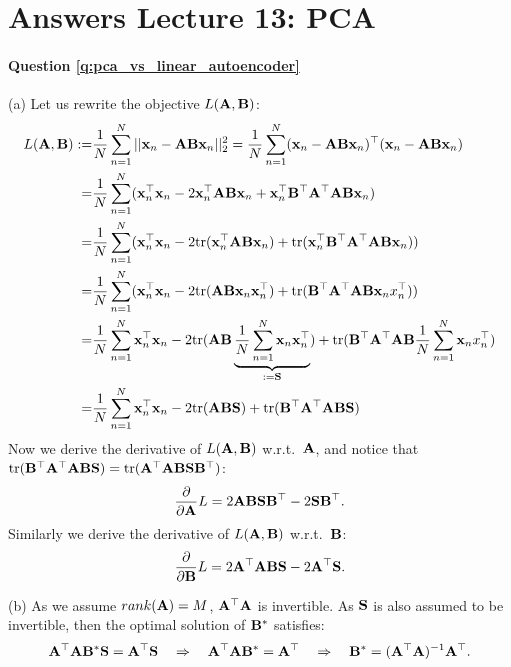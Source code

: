 \section{Answers Lecture 13: PCA}

\paragraph{Question \ref{q:pca_vs_linear_autoencoder}}
(a) Let us rewrite the objective $L(\mathbf A, \mathbf B)$:
\begin{equation*}
\begin{aligned}
L(\mathbf A, \mathbf B) :=& \frac{1}{N} \sum_{n=1}^N || \mathbf{x}_n - \mathbf A \mathbf B \mathbf{x}_n ||_2^2 = \frac{1}{N} \sum_{n=1}^N (\mathbf{x}_n - \mathbf A \mathbf B \mathbf{x}_n)^\top (\mathbf{x}_n - \mathbf A \mathbf B \mathbf{x}_n) \\
=& \frac{1}{N} \sum_{n=1}^N (\mathbf{x}_n^\top \mathbf{x}_n - 2 \mathbf{x}_n^\top \mathbf A \mathbf B \mathbf{x}_n + \mathbf{x}_n^\top \mathbf B^\top \mathbf A^\top \mathbf A \mathbf B \mathbf{x}_n) \\
=& \frac{1}{N} \sum_{n=1}^N (\mathbf{x}_n^\top \mathbf{x}_n - 2 \text{tr}(\mathbf{x}_n^\top \mathbf A \mathbf B \mathbf{x}_n) + \text{tr}(\mathbf{x}_n^\top \mathbf B^\top \mathbf A^\top \mathbf A \mathbf B \mathbf{x}_n)) \\
=& \frac{1}{N} \sum_{n=1}^N (\mathbf{x}_n^\top \mathbf{x}_n - 2 \text{tr}(\mathbf A \mathbf B \mathbf{x}_n \mathbf{x}_n^\top ) + \text{tr}(\mathbf B^\top \mathbf A^\top \mathbf A \mathbf B \mathbf{x}_n x_n^\top )) \\
=& \frac{1}{N} \sum_{n=1}^N \mathbf{x}_n^\top \mathbf{x}_n - 2 \text{tr}(\mathbf A \mathbf B \underbrace{\frac{1}{N} \sum_{n=1}^N \mathbf{x}_n \mathbf{x}_n^\top}_{:=\mathbf{S}} ) + \text{tr}(\mathbf B^\top \mathbf A^\top \mathbf A \mathbf B \frac{1}{N} \sum_{n=1}^N \mathbf{x}_n x_n^\top ) \\
=& \frac{1}{N} \sum_{n=1}^N \mathbf{x}_n^\top \mathbf{x}_n - 2 \text{tr}(\mathbf A \mathbf B \mathbf{S} ) + \text{tr}(\mathbf B^\top \mathbf A^\top \mathbf A \mathbf B \mathbf{S} )
\end{aligned}
\end{equation*}
Now we derive the derivative of $L(\mathbf A, \mathbf B)$ w.r.t.~$\mathbf A$, and notice that $ \text{tr}(\mathbf B^\top \mathbf A^\top \mathbf A \mathbf B \mathbf{S} ) =  \text{tr}(\mathbf A^\top \mathbf A \mathbf B \mathbf{S} \mathbf B^\top )$:
\begin{equation*}
\frac{\partial}{\partial \mathbf A} L = 2 \mathbf A \mathbf B \mathbf{S} \mathbf B^\top - 2 \mathbf{S} \mathbf B^\top.
\end{equation*}
Similarly we derive the derivative of $L(\mathbf A, \mathbf B)$ w.r.t.~$\mathbf B$:
\begin{equation*}
\frac{\partial}{\partial \mathbf B} L = 2 \mathbf A^\top \mathbf A \mathbf B \mathbf{S} - 2 \mathbf A^\top \mathbf{S}.
\end{equation*}

(b) As we assume $rank(\mathbf A) = M$, $\mathbf A^\top \mathbf A$ is invertible. As $\mathbf{S}$ is also assumed to be invertible, then the optimal solution of $\mathbf B^*$ satisfies:
$$ \mathbf A^\top \mathbf A \mathbf B^* \mathbf{S} =\mathbf A^\top \mathbf{S} \quad \Rightarrow \quad  \mathbf A^\top \mathbf A \mathbf B^* =\mathbf A^\top \quad \Rightarrow \quad \mathbf B^* = (\mathbf A^\top \mathbf A)^{-1} \mathbf A^\top.$$

